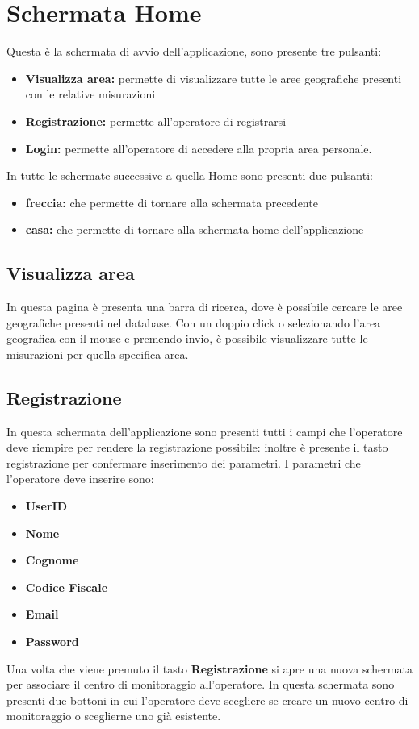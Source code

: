 \section{Schermata Home}
Questa è la schermata di avvio dell'applicazione, sono presente tre pulsanti:
\begin{itemize}
	\item \textbf{Visualizza area:} permette di visualizzare tutte le aree geografiche presenti con le relative misurazioni 
	\item \textbf{Registrazione:} permette all'operatore di registrarsi
	\item \textbf{Login:} permette all'operatore di accedere alla propria area personale. 
\end{itemize}
In tutte le schermate successive a quella Home sono presenti due pulsanti:
\begin{itemize}
	\item \textbf{freccia:} che permette di tornare alla schermata precedente  
	\item \textbf{casa:} che permette di tornare alla schermata home dell'applicazione
\end{itemize}
\subsection{Visualizza area}
In questa pagina è presenta una barra di ricerca, dove è possibile cercare le aree geografiche presenti nel database. Con un doppio click o selezionando l'area geografica con il mouse e premendo invio, è possibile visualizzare tutte le misurazioni per quella specifica area.

\subsection{Registrazione}\label{VisualizzaArea}
In questa schermata dell'applicazione sono presenti tutti i campi che l'operatore deve riempire per rendere la registrazione possibile: inoltre è presente il tasto registrazione per confermare inserimento dei parametri.
I parametri che l'operatore deve inserire sono:
\begin{itemize}
	\item  \textbf{UserID}
	\item  \textbf{Nome}
	\item  \textbf{Cognome}
	\item  \textbf{Codice Fiscale}
	\item  \textbf{Email}
	\item  \textbf{Password}
\end{itemize}
Una volta che viene premuto il tasto \textbf{Registrazione} si apre una nuova schermata per associare il centro di monitoraggio all'operatore.
In questa schermata sono presenti due bottoni in cui l'operatore deve scegliere se creare un nuovo centro di monitoraggio o sceglierne uno già esistente.
